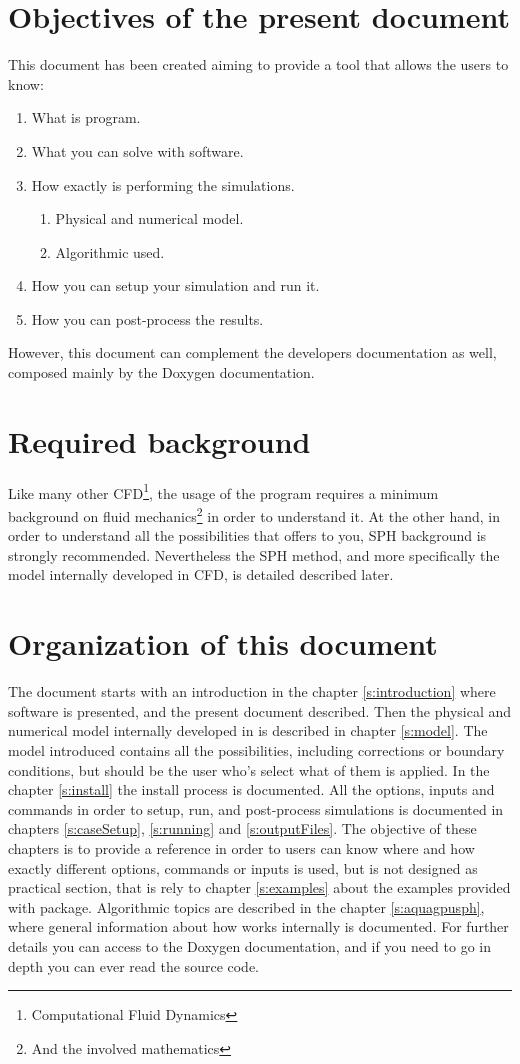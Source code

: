 \section{Objectives of the present document}
%
This document has been created aiming to provide a tool that allows the \NAME users to know:
%
\begin{enumerate}
	\item What is \NAME program.
	\item What you can solve with \NAME software.
	\item How exactly is \NAME performing the simulations.
	\begin{enumerate}
		\item Physical and numerical model.
		\item Algorithmic used.
	\end{enumerate}
	\item How you can setup your simulation and run it.
	\item How you can post-process the results.
\end{enumerate}
%
However, this document can complement the developers documentation as well, composed mainly
by the Doxygen documentation.
%
\section{Required background}
%
Like many other CFD\footnote{Computational Fluid Dynamics}, the usage of the program requires
a minimum background on fluid mechanics\footnote{And the involved mathematics} in order to
understand it.\rc
%
At the other hand, in order to understand all the possibilities that \NAME offers to you, SPH
background is strongly recommended. Nevertheless the SPH method, and more specifically the
model internally developed in \NAME CFD, is detailed described later.
%
\section{Organization of this document}
%
The document starts with an introduction in the chapter \ref{s:introduction} where \NAME
software is presented, and the present document described.\rc
%
Then the physical and numerical model internally developed in \NAME is described in chapter
\ref{s:model}. The model introduced contains all the possibilities, including corrections
or boundary conditions, but should be the user who's select what of them is applied.\rc
%
In the chapter \ref{s:install} the \NAME install process is documented.\rc
%
All the options, inputs and commands in order to setup, run, and post-process simulations is
documented in chapters \ref{s:caseSetup}, \ref{s:running} and \ref{s:outputFiles}. The
objective of these chapters is to provide a reference in order to users can know where and
how exactly different options, commands or inputs is used, but is not designed as practical
section, that is rely to chapter \ref{s:examples} about the examples provided with \NAME
package.\rc
%
Algorithmic topics are described in the chapter \ref{s:aquagpusph}, where general information
about how \NAME works internally is documented. For further details you can access to the
Doxygen documentation, and if you need to go in depth you can ever read the source code.
%